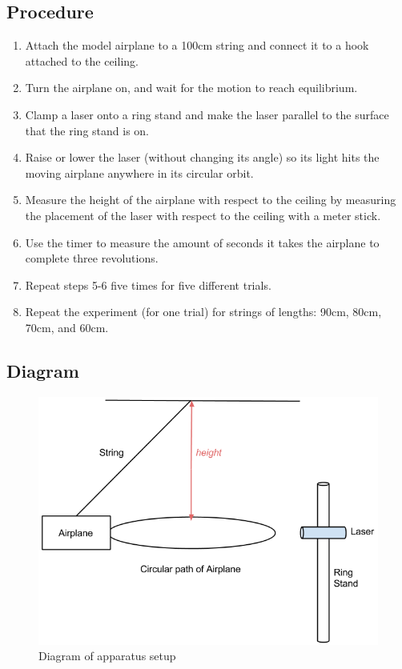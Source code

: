 \documentclass[10pt, letterpaper]{article}
\begin{document}
\subsection{Procedure}
\begin{enumerate}
  \item Attach the model airplane to a 100cm string and connect it to a hook attached to the ceiling.
  \item Turn the airplane on, and wait for the motion to reach equilibrium.
  \item Clamp a laser onto a ring stand and make the laser parallel to the surface that the ring stand is on.
  \item Raise or lower the laser (without changing its angle) so its light hits the moving airplane anywhere in its circular orbit.
  \item Measure the height of the airplane with respect to the ceiling by measuring the placement of the laser with respect to the ceiling with a meter stick.
  \item Use the timer to measure the amount of seconds it takes the airplane to complete three revolutions.
  \item Repeat steps 5-6 five times for five different trials.
  \item Repeat the experiment (for one trial) for strings of lengths: 90cm, 80cm, 70cm, and 60cm.
\end{enumerate}

\subsection{Diagram}
\begin{figure}[!htb]
\centering
\includegraphics[scale=0.5]{Lab1_drawing.png}
\caption{Diagram of apparatus setup}
\end{figure}
\end{document}
